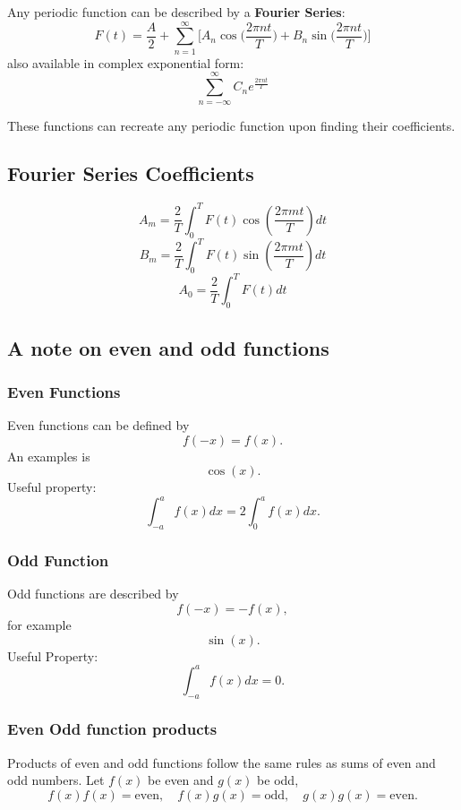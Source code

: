 Any periodic function can be described by a \textbf{Fourier Series}:
\begin{equation}
	F(t)=\frac{A}{2}+\sum_{n=1}^{\infty}\biggl[ A_{n}\cos\big( \frac{2\pi nt}{T}  \big)+B_{n}\sin\big(\frac{2\pi n t}{T}\big)	\biggr]
\end{equation}
also available in complex exponential form:
\begin{equation}
\sum_{n=-\infty}^{\infty}C_{n}e^{\frac{2\pi nt}{T}}
\end{equation}

These functions can recreate any periodic function upon finding their coefficients.
\subsection{Fourier Series Coefficients}
\begin{equation}
	A_{m}=\frac{2}{T}\int_{0}^{T}F(t)\cos(\frac{2\pi m t}{T})dt
\end{equation}
\begin{equation}
	B_{m}=\frac{2}{T}\int_{0}^{T}F(t)\sin(\frac{2\pi m t}{T})dt
\end{equation}
\begin{equation}
	A_0=\frac{2}{T}\int_{0}^{T}F(t)dt
\end{equation}


\subsection{A note on even and odd functions}
\subsubsection{Even Functions}
Even functions can be defined by \[
f(-x)=f(x).\] An examples is \[
\cos(x).\] 
Useful property:
\[\int_{-a}^{a}f(x)dx=2\int_0^{a}f(x)dx.\] 
\subsubsection{Odd Function}
Odd functions are described by \[
f(-x)=-f(x),\] for example \[
\sin(x).\] 
Useful Property:
\[\int_{-a}^{a}f(x)dx=0.\] 
\subsubsection{Even Odd function products}
Products of even and odd functions follow the same rules as sums of even and odd numbers.
Let $ f(x) $ be even and $ g(x) $ be odd,
\[f(x)f(x)=\text{even},\quad f(x)g(x)=\text{odd},\quad g(x)g(x)=\text{even}.\] 

